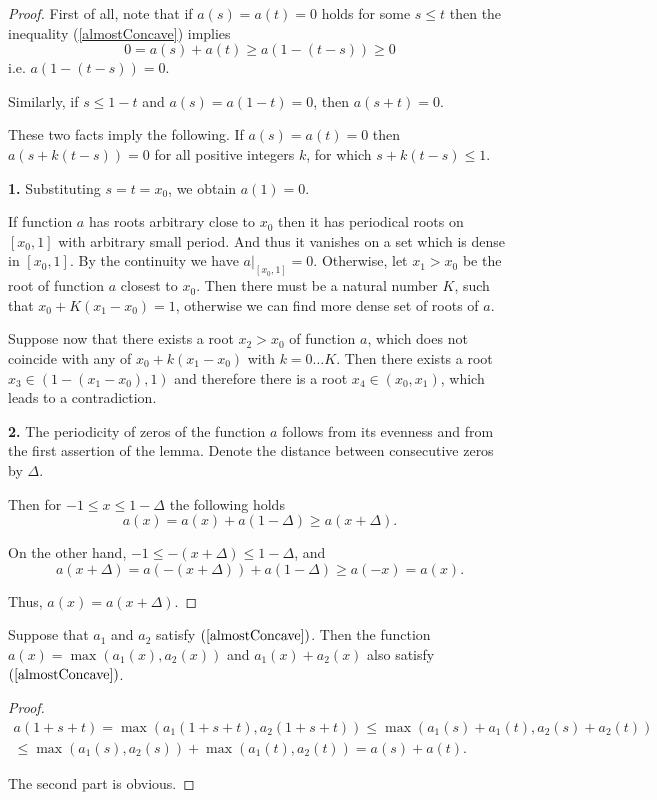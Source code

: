 \begin{proof}
First of all, note that if $a(s) = a(t) = 0$ holds for some $s \le t$
then the inequality (\ref{almostConcave}) implies
$$0 = a(s) + a(t) \ge a( 1 - (t - s) ) \ge 0$$
i.e. $a(1 - (t - s)) = 0$.

Similarly, if $s \le 1 - t$ and $a(s) = a(1 - t) = 0$, then $a(s + t) = 0$.

These two facts imply the following.
If $a(s) = a(t) = 0$ then $a(s + k(t - s)) = 0$ for all positive integers $k$, for which $s + k(t - s) \le 1$.

{\bf 1.}
Substituting $s = t = x_0$, we obtain $a(1) = 0$.

If function $a$ has roots arbitrary close to $x_0$
then it has periodical roots on $[x_0, 1]$ with arbitrary small period.
And thus it vanishes on a set which is dense in $[x_0, 1]$.
By the continuity we have $a\Big |_{[x_0, 1]} = 0$.
Otherwise, let $x_1 > x_0$ be the root of function $a$ closest to $x_0$.
Then there must be a natural number $K$, such that $x_0 + K(x_1 - x_0) = 1$,
otherwise we can find more dense set of roots of $a$.

Suppose now that there exists a root $x_2 > x_0$ of function $a$,
which does not coincide with any of $x_0 + k ( x_1 - x_0 )$ with $k = 0 \dots K$.
Then there exists a root $x_3 \in (1 - (x_1 - x_0), 1)$
and therefore there is a root $x_4 \in (x_0, x_1)$, which leads to a contradiction.

{\bf 2.} The periodicity of zeros of the function $a$ follows from its evenness and from the first assertion of the lemma.
Denote the distance between consecutive zeros by $\Delta$.

Then for $-1 \le x \le 1 - \Delta$ the following holds
$$a(x) = a(x) + a(1 - \Delta) \ge a(x + \Delta).$$

On the other hand, $-1 \le -(x + \Delta) \le 1 - \Delta$, and
$$a(x + \Delta) = a(-(x + \Delta)) + a(1 - \Delta) \ge a(-x) = a(x).$$

Thus, $a(x) = a(x + \Delta)$.
\end{proof}

\begin{lm}
\label{maxSumConcave}
Suppose that $a_1$ and $a_2$ satisfy $(\ref{almostConcave})$.
Then the function $a(x) = \max (a_1(x), a_2(x))$ and $a_1(x) + a_2(x)$ also satisfy $(\ref{almostConcave})$.
\end{lm}
\begin{proof}
\begin{multline*}
a(1 + s + t) = \max(a_1( 1 + s + t), a_2(1 + s + t)) \le
\max(a_1(s) + a_1(t), a_2(s) + a_2(t)) \\
\le \max(a_1(s), a_2(s)) + \max(a_1(t), a_2(t)) =
a(s) + a(t).
\end{multline*}

The second part is obvious.
\end{proof}

